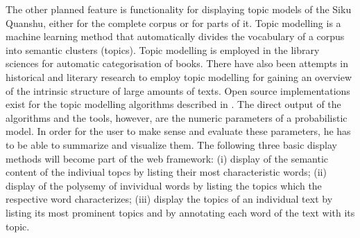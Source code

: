\documentclass[12pt, draft]{article}
\begin{document}
The other planned feature is functionality for displaying topic models of the Siku Quanshu, either for the complete corpus or for parts of it. Topic modelling is a machine learning method that automatically divides the vocabulary of a corpus into semantic clusters (topics). Topic modelling is employed in the library sciences for automatic categorisation of books. There have also been attempts in historical and literary research to employ topic modelling for gaining an overview of the intrinsic structure of large amounts of texts.\cite{Templeton:2011} Open source implementations exist for the topic modelling algorithms described in \cite{Dirichlet:2003}. The direct output of the algorithms and the tools, however, are the numeric parameters of a probabilistic model. In order for the user to make sense and evaluate these parameters, he has to be able to summarize and visualize them. The following three basic display methods will become part of the web framework: (i) display of the semantic content of the indiviual topcs by listing their most characteristic words; (ii) display of the polysemy of invividual words by listing the topics which the respective word characterizes; (iii) display the topics of an individual text by listing its most prominent topics and by annotating each word of the text with its topic.



\end{document}
